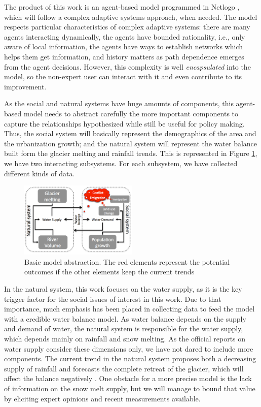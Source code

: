 \documentclass{article}
\begin{document}
The product of this work is an agent-based model programmed in Netlogo \cite{wilensky_introduction_2015}, which will follow a complex adaptive systems approach, when needed. The model respects particular characteristics of complex adaptive systems: there are many agents interacting dynamically, the agents have bounded rationality, i.e., only aware of local information, the agents have ways to establish networks which helps them get information, and history matters as path dependence emerges from the agent decisions. However, this complexity is well \emph{encapsulated} into the model, so the non-expert user can interact with it and even contribute to its improvement. 

As the social and natural systems have huge amounts of components, this agent-based model needs to abstract carefully the more important components to capture the  relationships hypothesized while still be useful for policy making. Thus, the social system will basically represent the demographics of the area and the urbanization growth; and the natural system will represent the water balance built form the glacier melting and rainfall trends. This is represented in Figure \ref{scheme}, we have two interacting subsystems. For each subsystem, we have collected different kinds of data.

\begin{figure}[ht]
  \centering
  \includegraphics[width=0.5\textwidth]{modelsummaryGraph}
  \caption[Basic model abstraction]{Basic model abstraction. The red elements represent the potential outcomes if the other elements keep the current trends}
  \label{scheme}
\end{figure}

In the natural system, this work focuses on the water supply, as it is the key trigger factor for the social issues of interest in this work. Due to that importance, much emphasis has been placed in collecting data to feed the model with a credible water balance model. As water balance depends on the supply and demand of water, the natural system is responsible for the water supply, which depends mainly on rainfall and snow melting. As the official reports on water supply consider these dimensions only, we have not dared to include more components. The current trend in the natural system proposes both a decreasing supply of rainfall and forecasts the complete retreat of the glacier, which will affect the balance negatively \cite{carlos_riesgos_2012,lopez-moreno_recent_2014}. One obstacle for a more precise model is the lack of information on the snow melt supply, but we will manage to bound that value by eliciting expert opinions and recent measurements available. 
\end{document}

